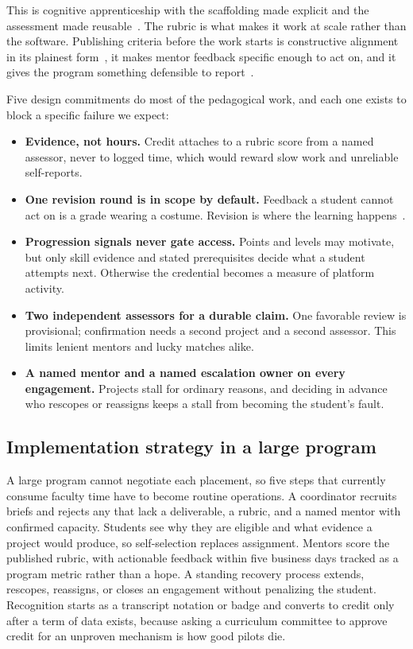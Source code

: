 \documentclass[10pt,letterpaper]{article}
\begin{document}
This is cognitive apprenticeship with the scaffolding made explicit and the assessment made
reusable~\cite{collins1989,wood1976}. The rubric is what makes it work at scale rather than the
software. Publishing criteria before the work starts is constructive alignment in its plainest
form~\cite{biggs1996}, it makes mentor feedback specific enough to act on, and it gives the program
something defensible to report~\cite{gulikers2004,jonsson2007}.

Five design commitments do most of the pedagogical work, and each one exists to block a specific
failure we expect:

\begin{itemize}
  \item \textbf{Evidence, not hours.} Credit attaches to a rubric score from a named assessor, never to
        logged time, which would reward slow work and unreliable self-reports.
  \item \textbf{One revision round is in scope by default.} Feedback a student cannot act on is a grade
        wearing a costume. Revision is where the learning happens~\cite{ericsson1993}.
  \item \textbf{Progression signals never gate access.} Points and levels may motivate, but only skill
        evidence and stated prerequisites decide what a student attempts next. Otherwise the credential
        becomes a measure of platform activity.
  \item \textbf{Two independent assessors for a durable claim.} One favorable review is provisional;
        confirmation needs a second project and a second assessor. This limits lenient mentors and
        lucky matches alike.
  \item \textbf{A named mentor and a named escalation owner on every engagement.} Projects stall for
        ordinary reasons, and deciding in advance who rescopes or reassigns keeps a stall from becoming
        the student's fault.
\end{itemize}

\subsection{Implementation strategy in a large program}

A large program cannot negotiate each placement, so five steps that currently consume faculty time have
to become routine operations. A coordinator recruits briefs and rejects any that lack a deliverable, a
rubric, and a named mentor with confirmed capacity. Students see why they are eligible and what
evidence a project would produce, so self-selection replaces assignment. Mentors score the published
rubric, with actionable feedback within five business days tracked as a program metric rather than a
hope. A standing recovery process extends, rescopes, reassigns, or closes an engagement without
penalizing the student. Recognition starts as a transcript notation or badge and converts to credit
only after a term of data exists, because asking a curriculum committee to approve credit for an
unproven mechanism is how good pilots die.
\end{document}
